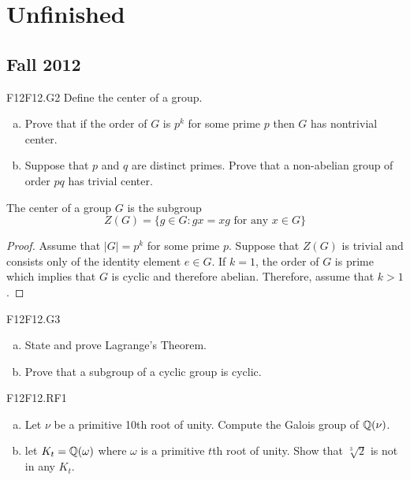 \documentclass[../AlgebraQualSolutions.tex]{subfiles}
\begin{document}
\section{Unfinished}

	\subsection{Fall 2012}

	\begin{prob}{F12}{F12.G2}
	Define the center of a group.
	\begin{enumerate}[(a)]
	\item Prove that if the order of $G$ is $p^k$ for some prime $p$ then $G$ has nontrivial center.
	\item Suppose that $p$ and $q$ are distinct primes. Prove that a non-abelian group of order $pq$ has trivial center.
	\end{enumerate}
	\end{prob}
	
	The center of a group $G$ is the subgroup
		\[Z(G) = \{g \in G: gx = xg \textrm{ for any $x \in G$} \} \]
	
	\begin{proof}
	Assume that $|G| = p^k$ for some prime $p$. Suppose that $Z(G)$ is trivial and consists only of the identity element $e \in G$. If $k = 1$, the order of $G$ is prime which implies that $G$ is cyclic and therefore abelian. Therefore, assume that $k > 1$.
	\end{proof}
	
	
	\begin{prob}{F12}{F12.G3}
	\begin{enumerate}[(a)]
	\item State and prove Lagrange's Theorem.
	\item Prove that a subgroup of a cyclic group is cyclic.
	\end{enumerate}
	\end{prob}
	
	\begin{prob}{F12}{F12.RF1}
	\begin{enumerate}[(a)]
	\item Let $\nu$ be a primitive 10th root of unity. Compute the Galois group of $\mathbb{Q}(\nu)$.
	\item let $K_t = \mathbb{Q}(\omega)$ where $\omega$ is a primitive $t$th root of unity. Show that $\sqrt[3]{2}$ is not in any $K_t$.
	\end{enumerate}
	\end{prob}
	
\end{document}

